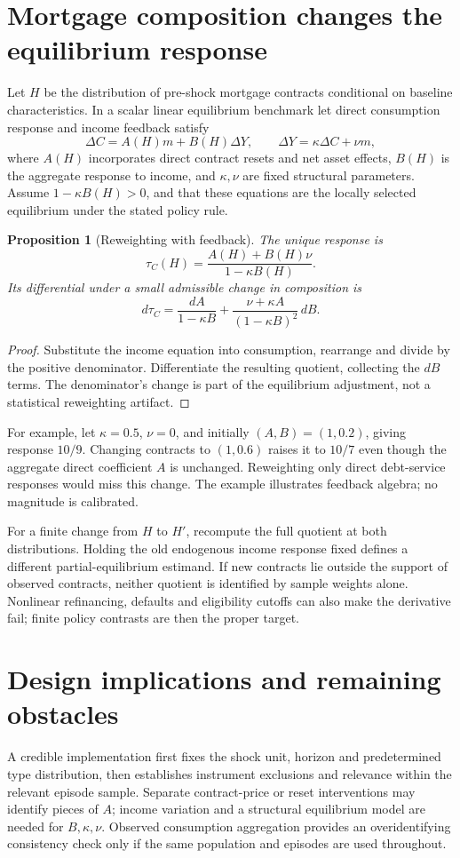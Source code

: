 \documentclass[11pt]{article}
\newtheorem{proposition}{Proposition}
\begin{document}
\section*{Mortgage composition changes the equilibrium response}
Let $H$ be the distribution of pre-shock mortgage contracts conditional on baseline characteristics. In a scalar linear equilibrium benchmark let direct consumption response and income feedback satisfy
\[
 \Delta C=A(H)m+B(H)\Delta Y,\qquad
 \Delta Y=\kappa\Delta C+\nu m,
\]
where $A(H)$ incorporates direct contract resets and net asset effects, $B(H)$ is the aggregate response to income, and $\kappa,\nu$ are fixed structural parameters. Assume $1-\kappa B(H)>0$, and that these equations are the locally selected equilibrium under the stated policy rule.

\begin{proposition}[Reweighting with feedback]
The unique response is
\[
 \tau_C(H)=\frac{A(H)+B(H)\nu}{1-\kappa B(H)}.
\]
Its differential under a small admissible change in composition is
\[
 d\tau_C=
 \frac{dA}{1-\kappa B}
 +\frac{\nu+\kappa A}{(1-\kappa B)^2}\,dB.
\]
\end{proposition}
\begin{proof}
Substitute the income equation into consumption, rearrange and divide by the positive denominator. Differentiate the resulting quotient, collecting the $dB$ terms. The denominator's change is part of the equilibrium adjustment, not a statistical reweighting artifact.
\end{proof}

For example, let $\kappa=0.5$, $\nu=0$, and initially $(A,B)=(1,0.2)$, giving response $10/9$. Changing contracts to $(1,0.6)$ raises it to $10/7$ even though the aggregate direct coefficient $A$ is unchanged. Reweighting only direct debt-service responses would miss this change. The example illustrates feedback algebra; no magnitude is calibrated.

For a finite change from $H$ to $H'$, recompute the full quotient at both distributions. Holding the old endogenous income response fixed defines a different partial-equilibrium estimand. If new contracts lie outside the support of observed contracts, neither quotient is identified by sample weights alone. Nonlinear refinancing, defaults and eligibility cutoffs can also make the derivative fail; finite policy contrasts are then the proper target.

\section*{Design implications and remaining obstacles}
A credible implementation first fixes the shock unit, horizon and predetermined type distribution, then establishes instrument exclusions and relevance within the relevant episode sample. Separate contract-price or reset interventions may identify pieces of $A$; income variation and a structural equilibrium model are needed for $B,\kappa,\nu$. Observed consumption aggregation provides an overidentifying consistency check only if the same population and episodes are used throughout.
\end{document}
